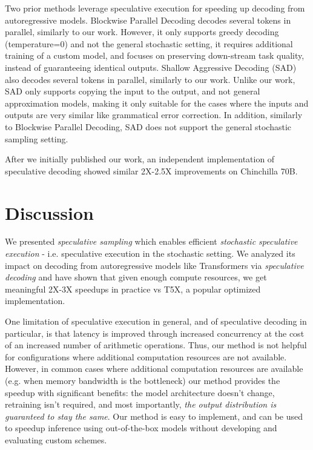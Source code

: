 \documentclass[nohyperref]{article}
\theoremstyle{plain}
\theoremstyle{definition}
\theoremstyle{remark}
\begin{document}
Two prior methods leverage speculative execution for speeding up decoding from autoregressive models.
Blockwise Parallel Decoding \citep{Blockwise_Parallel_Decoding} decodes several tokens in parallel, similarly to our work.
However, it only supports greedy decoding (temperature=0) and not the general stochastic setting, it requires additional training of a custom model, and focuses on preserving down-stream task quality, instead of guaranteeing identical outputs.
Shallow Aggressive Decoding (SAD) \citep{sad} also decodes several tokens in parallel, similarly to our work.
Unlike our work, SAD only supports copying the input to the output, and not general approximation models, making it only suitable for the cases where the inputs and outputs are very similar like grammatical error correction. In addition, similarly to Blockwise Parallel Decoding, SAD does not support the general stochastic sampling setting.

After we initially published our work, an independent implementation of speculative decoding \citep{chen2023accelerating} showed similar 2X-2.5X improvements on Chinchilla 70B.


\section{Discussion}

We presented \emph{speculative sampling} which enables efficient \emph{stochastic speculative execution} - i.e. speculative execution in the stochastic setting. We analyzed its impact on decoding from autoregressive models like Transformers via \emph{speculative decoding} and have shown that given enough compute resources, we get meaningful 2X-3X speedups in practice vs T5X, a popular optimized implementation.

One limitation of speculative execution in general, and of speculative decoding in particular, is that latency is improved through increased concurrency at the cost of an increased number of arithmetic operations. Thus, our method is not helpful for configurations where additional computation resources are not available. However, in common cases where additional computation resources are available (e.g. when memory bandwidth is the bottleneck) our method provides the speedup with significant benefits: the model architecture doesn't change, retraining isn't required, and most importantly, \emph{the output distribution is guaranteed to stay the same}. Our method is easy to implement, and can be used to speedup inference using out-of-the-box models without developing and evaluating custom schemes.
\end{document}
